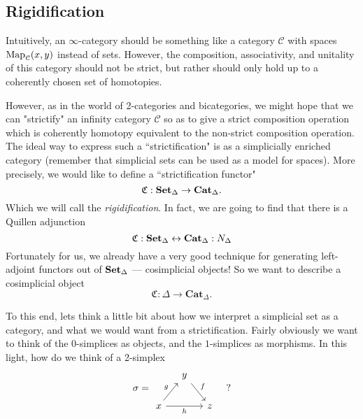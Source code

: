 \subsection{Rigidification}
\label{ssc:rigidification}

Intuitively, an $\infty$-category should be something like a category $\mathcal{C}$ with spaces $\operatorname{Map}_{\mathcal{C}}(x,y)$ instead of sets. However, the composition, associativity, and unitality of this category should not be strict, but rather should only hold up to a coherently chosen set of homotopies. 

However, as in the world of 2-categories and bicategories, we might hope that we can "strictify" an infinity category $\mathcal{C}$ so as to give a strict composition operation which is coherently homotopy equivalent to the non-strict composition operation. The ideal way to express such a ``strictification" is as a simplicially enriched category (remember that simplicial sets can be used as a model for spaces). More precisely, we would like to define a ``strictification functor"
\[
\mathfrak{C}:\operatorname{\mathbf{Set}_{\Delta}} \to \mathbf{Cat}_\Delta. 
\] 
Which we will call the \emph{rigidification}. In fact, we are going to find that there is a Quillen adjunction 
\[
\mathfrak{C} : \operatorname{\mathbf{Set}_{\Delta}} \leftrightarrow \mathbf{Cat}_\Delta : N_{\Delta}
\] 
Fortunately for us, we already have a very good technique for generating left-adjoint functors out of $\operatorname{\mathbf{Set}_{\Delta}}$ --- cosimplicial objects! So we want to describe a cosimplicial object 
\[
\mathfrak{C}:\Delta\to \mathbf{Cat}_\Delta. 
\]

To this end, lets think a little bit about how we interpret a simplicial set as a category, and what we would want from a strictification. Fairly obviously we want to think of the 0-simplices as objects, and the $1$-simplices as morphisms. In this light, how do we think of a 2-simplex 
\begin{equation*}
\sigma=\begin{tikzcd}[column sep=small]
& y
\arrow[dr, "f"]
\\
x
\arrow[ur, "g"]
\arrow[rr, "h"']
&& z
\end{tikzcd} \quad ?
\end{equation*}

